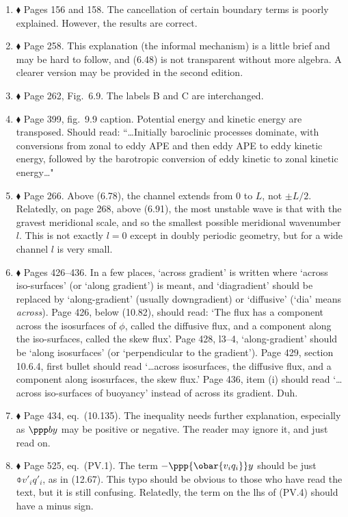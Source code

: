 \documentclass[10pt]{article}
\newcommand{\eq}{eq.\ } \newcommand{\Eq}{Eq.\ }
\renewcommand{\star}{\ensuremath{\blacklozenge} }
\begin{document}
\begin{enumerate}

\item \star \label{cancel} Pages 156 and 158. The cancellation of certain boundary terms is poorly explained. However, the results are correct. 

\item \star \label{informal} Page 258. This explanation (the informal mechanism) is a little brief and may be hard to follow, and (6.48) is not transparent without more algebra. A clearer version may be provided in the second edition. 

\item \star \label{eadyschem} Page 262, Fig.\ 6.9. The labels {\sf B} and {\sf C} are interchanged. 

\item \star \label{simmhosk} Page 399, fig.\ 9.9 caption.  Potential energy and kinetic energy are transposed. Should read: ``\ldots Initially baroclinic processes dominate, with conversions from zonal to eddy APE and then eddy APE to eddy kinetic energy, followed by the barotropic conversion of eddy kinetic to zonal kinetic energy\ldots"

\item \star \label{channel} Page 266. Above (6.78), the channel extends from $0$ to $L$, not $\pm L/2$. Relatedly, on page 268, above (6.91), the most unstable wave is that with the gravest meridional scale, and so the smallest possible meridional wavenumber $l$. This is not exactly $l=0$ except in doubly periodic geometry, but for a wide channel $l$ is very small.

\item \star Pages 426--436. In a few places, `across gradient' is written where `across iso-surfaces' (or `along gradient') is meant, and  `diagradient' should be replaced by `along-gradient' (usually downgradient) or `diffusive' (`dia' means \emph{across}). Page 426, below (10.82), should read: `The flux has a component across the isosurfaces of $\phi$, called the diffusive flux, and a component along the iso-surfaces, called the skew flux'. Page 428, l3--4, `along-gradient' should be `along isosurfaces' (or `perpendicular to the gradient'). Page 429, section 10.6.4, first bullet should read `\ldots across isosurfaces, the diffusive flux, and a component along isosurfaces, the skew flux.'  Page 436, item (i) should read `\ldots across iso-surfaces of buoyancy' instead of across its gradient. Duh.

\item \star Page 434, \eq (10.135). The inequality needs further explanation, especially as $\ppp by $ may be positive or negative.  The reader may ignore it, and just read on.

\item \star Page 525, \eq (PV.1). The term $-\ppp{\obar{v_i q_i}}y$ should be just $\obar{v'_i q'_i}$, as in (12.67). This typo should be obvious to those who have read the text, but it is still confusing. Relatedly, the term on the lhs of (PV.4) should have a minus sign.

\end{enumerate}
\end{document}
